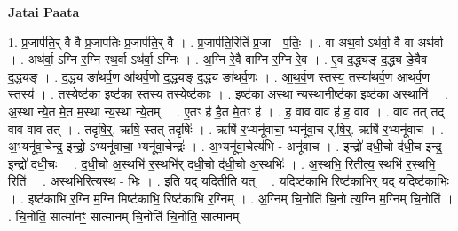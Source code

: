 \documentclass[17pt]{extarticle}
\begin{document}
\textbf{Jatai Paata} \newline

1. प्र॒जाप॑ति॒र् वै वै प्र॒जाप॑तिः प्र॒जाप॑ति॒र् वै । . प्र॒जाप॑ति॒रिति॑ प्र॒जा - प॒तिः॒ । . वा अथ॒र्वा ऽथ॑र्वा॒ वै वा अथ॑र्वा । . अथ॑र्वा॒ ऽग्नि र॒ग्नि रथ॒र्वा ऽथ॑र्वा॒ ऽग्निः । . अ॒ग्नि रे॒वै वाग्नि र॒ग्नि रे॒व । . ए॒व द॒द्ध्यङ् द॒द्ध्य ङे॒वैव द॒द्ध्यङ् । . द॒द्ध्य ङा॑थर्व॒ण आ॑थर्व॒णो द॒द्ध्यङ् द॒द्ध्य ङा॑थर्व॒णः । . आ॒थ॒र्व॒ण स्तस्य॒ तस्या॑थर्व॒ण आ॑थर्व॒ण स्तस्य॑ । . तस्येष्ट॑का॒ इष्ट॑का॒ स्तस्य॒ तस्येष्ट॑काः । . इष्ट॑का अ॒स्था न्य॒स्थानीष्ट॑का॒ इष्ट॑का अ॒स्थानि॑ । . अ॒स्था न्ये॒त मे॒त म॒स्था न्य॒स्था न्ये॒तम् । . ए॒तꣳ ह॑ है॒त मे॒तꣳ ह॑ । . ह॒ वाव वाव ह॑ ह॒ वाव । . वाव तत् तद् वाव वाव तत् । . तदृषि॒र्॒. ऋषि॒ स्तत् तदृषिः॑ । . ऋषि॑ र॒भ्यनू॑वाचा॒ भ्यनू॑वा॒च र्.षि॒र्॒. ऋषि॑ र॒भ्यनू॑वाच । . अ॒भ्यनू॑वा॒चेन्द्र॒ इन्द्रो॒ ऽभ्यनू॑वाचा॒ भ्यनू॑वा॒चेन्द्रः॑ । . अ॒भ्यनू॑वा॒चेत्य॑भि - अनू॑वाच । . इन्द्रो॑ दधी॒चो द॑धी॒च इन्द्र॒ इन्द्रो॑ दधी॒चः । . द॒धी॒चो अ॒स्थभि॑ र॒स्थभि॑र् दधी॒चो द॑धी॒चो अ॒स्थभिः॑ । . अ॒स्थभि॒ रितीत्य॒ स्थभि॑ र॒स्थभि॒ रिति॑ । . अ॒स्थभि॒रित्य॒स्थ - भिः॒ । . इति॒ यद् यदितीति॒ यत् । . यदिष्ट॑काभि॒ रिष्ट॑काभि॒र् यद् यदिष्ट॑काभिः । . इष्ट॑काभि र॒ग्नि म॒ग्नि मिष्ट॑काभि॒ रिष्ट॑काभि र॒ग्निम् । . अ॒ग्निम् चि॒नोति॑ चि॒नो त्य॒ग्नि म॒ग्निम् चि॒नोति॑ । . चि॒नोति॒ सात्मा॑नꣳ॒॒ सात्मा॑नम् चि॒नोति॑ चि॒नोति॒ सात्मा॑नम् । \newline
\end{document}
